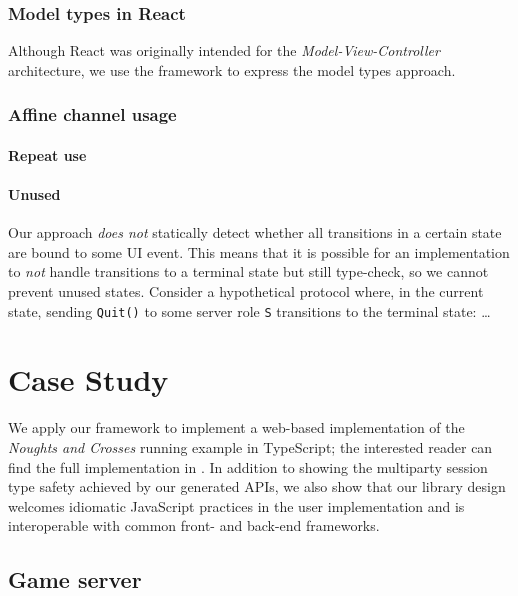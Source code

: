 \documentclass[submission,copyright,creativecommons]{eptcs}
\begin{document}
\subsubsection{Model types in React}
Although React was originally intended for the \textit{Model-View-Controller} architecture, we use the framework to express the model types approach.


\subsubsection{Affine channel usage}

\paragraph{Repeat use}

\paragraph{Unused} Our approach \textit{does not} statically detect whether all transitions in a certain state are bound to some UI event. This means that it is possible for an implementation to \textit{not} handle transitions to a terminal state but still type-check, so we cannot prevent unused states. Consider a hypothetical protocol where, in the current state, sending \texttt{Quit()} to some server role \texttt{S} transitions to the terminal state: \dots

\section{Case Study}
\label{section:example}
We apply our framework to implement a web-based implementation of the \textit{Noughts and Crosses} running example in TypeScript; the interested reader can find the full implementation in \cite{NoughtsAndCrosses}. In addition to showing the multiparty session type safety achieved by our generated APIs, we also show that our library design welcomes idiomatic JavaScript practices in the user implementation and is interoperable with common front- and back-end frameworks.
 
\subsection{Game server}
\label{section:exampleserver}
\end{document}
